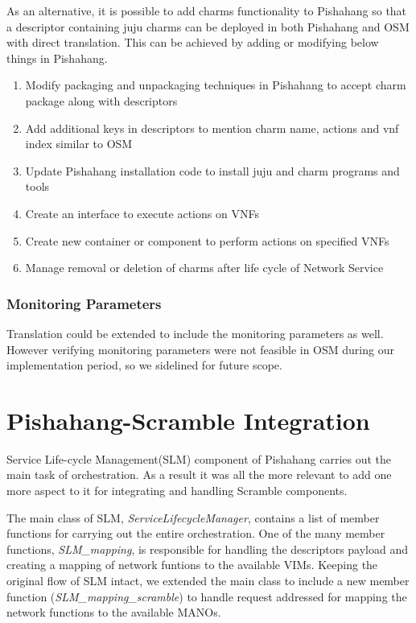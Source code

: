 As an alternative, it is possible to add charms functionality to Pishahang so that a descriptor containing juju charms can be deployed in both Pishahang and OSM with direct translation. This can be achieved by adding or modifying below things in Pishahang.
\begin{enumerate}
	\item Modify packaging and unpackaging techniques in Pishahang to accept charm package along with descriptors
	\item Add additional keys in descriptors to mention charm name, actions and vnf index similar to OSM
	\item Update Pishahang installation code to install juju and charm programs and tools
	\item Create an interface to execute actions on VNFs
	\item Create new container or component to perform actions on specified VNFs
	\item Manage removal or deletion of charms after life cycle of Network Service 
\end{enumerate} 


\subsubsection{Monitoring Parameters}
Translation could be extended to include the monitoring parameters as well. However verifying monitoring parameters were not feasible in OSM during our implementation period, so we sidelined for future scope.

\newpage





\section{Pishahang-Scramble Integration}

Service Life-cycle Management(SLM) component of Pishahang carries out the main task of orchestration. As a result it was all the more relevant to add one more aspect to it for integrating and handling Scramble components.

The main class of SLM, \textit{ServiceLifecycleManager}, contains a list of member functions for carrying out the entire orchestration. One of the many member functions, \textit{SLM\_mapping}, is responsible for handling the descriptors payload and creating a mapping of network funtions to the available VIMs. Keeping the original flow of SLM intact, we extended the main class to include a new member function (\textit{SLM\_mapping\_scramble}) to handle request addressed for mapping the network functions to the available MANOs.

